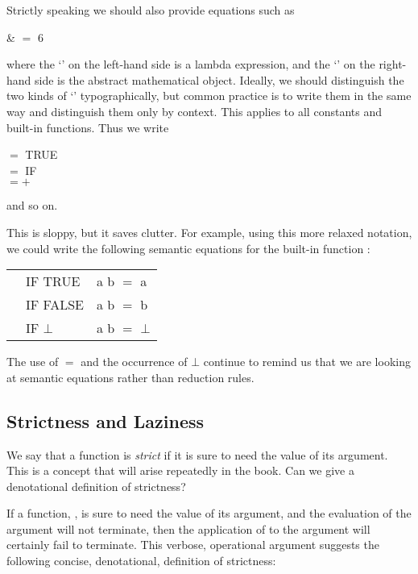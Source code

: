 Strictly speaking we should also provide equations such as
\begin{mlalign}
     & $=$ 6
\end{mlalign}
where the `' on the left-hand side is a lambda expression, and the `' on the
right-hand side is the abstract mathematical object. Ideally, we should distinguish the two kinds of `' typographically, but common practice is to
write them in the same way and distinguish them only by context. This applies
to all constants and built-in functions. Thus we write
\begin{mlcoded}
     $=$ TRUE \\
     $=$ IF \\
     $= +$
\end{mlcoded}
and so on.

This is sloppy, but it saves clutter. For example, using this more relaxed
notation, we could write the following semantic equations for the built-in
function :
\begin{mlcoded}
    \setlength{\tabcolsep}{2pt}
    \begin{tabular}{lll}
    &IF TRUE &a b $=$ a \\
    &IF FALSE &a b $=$ b \\
    &IF $\bot$ &a b $=$ $\bot$
    \end{tabular}
\end{mlcoded}
The use of $=$ and the occurrence of $\bot$ continue to remind us that we are looking
at semantic equations rather than reduction rules.

\subsection{Strictness and Laziness}

We say that a function is \textit{strict} if it is sure to need the value of its argument.
This is a concept that will arise repeatedly in the book. Can we give a
denotational definition of strictness?

If a function, , is sure to need the value of its argument, and the evaluation
of the argument will not terminate, then the application of  to the argument
will certainly fail to terminate. This verbose, operational argument suggests
the following concise, denotational, definition of strictness:


